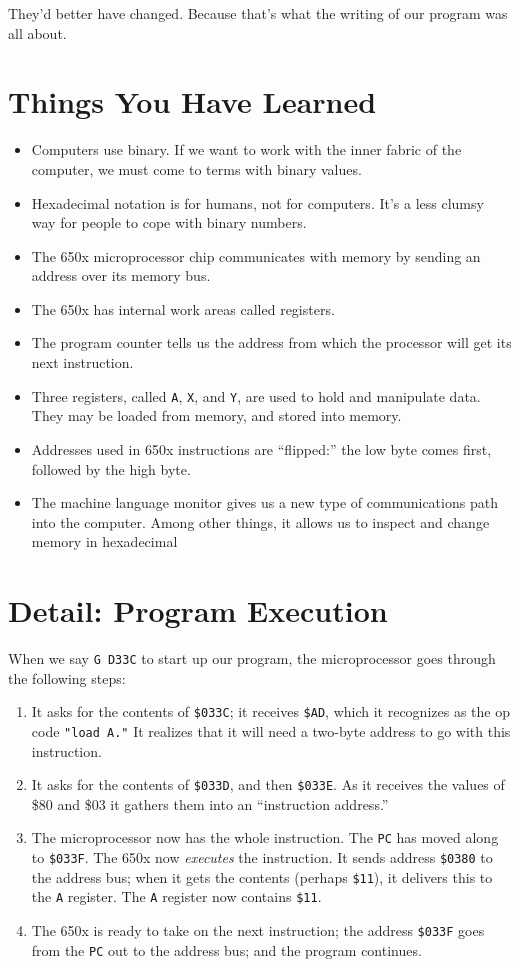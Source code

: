 \documentclass[11pt,a4paper,titlepage]{memoir}
\begin{document}
They'd better have changed. Because that's what the writing of our program was all about.

\section{Things You Have Learned}

\begin{itemize}
	\item Computers use binary. If we want to work with the inner fabric of the computer, we must come to terms with binary values.
	\item Hexadecimal notation is for humans, not for computers. It's a less clumsy way for people to cope with binary numbers.
	\item The 650x microprocessor chip communicates with memory by sending an address over its memory bus.
	\item The 650x has internal work areas called registers.
	\item The program counter tells us the address from which the processor will get its next instruction.
	\item Three registers, called \texttt{A}, \texttt{X}, and \texttt{Y}, are used to hold and manipulate data. They may be loaded from memory, and stored into memory.
	\item Addresses used in 650x instructions are ``flipped:'' the low byte comes first, followed by the high byte.
	\item The machine language monitor gives us a new type of communications path into the computer. Among other things, it allows us to inspect and change memory in hexadecimal
\end{itemize}
\section{Detail: Program Execution}
When we say \texttt{G D33C} to start up our program, the microprocessor goes
through the following steps:

\begin{enumerate}
	\item It asks for the contents of \texttt{\$033C}; it receives \texttt{\$AD}, which it recognizes as the op code \texttt{"load A."} It realizes that it will need a two-byte address to go with this instruction.
	\item It asks for the contents of \texttt{\$033D}, and then \texttt{\$033E}. As it receives the values of \$80 and \$03 it gathers them into an ``instruction address.''
	\item The microprocessor now has the whole instruction. The \texttt{PC} has moved along to \texttt{\$033F}. The 650x now \emph{executes} the instruction. It sends address \texttt{\$0380} to the address bus; when it gets the contents (perhaps \texttt{\$11}), it delivers this to the \texttt{A} register. The \texttt{A} register now contains \texttt{\$11}.
	\item The 650x is ready to take on the next instruction; the address \texttt{\$033F} goes from the \texttt{PC} out to the address bus; and the program continues.
\end{enumerate}
\end{document}
